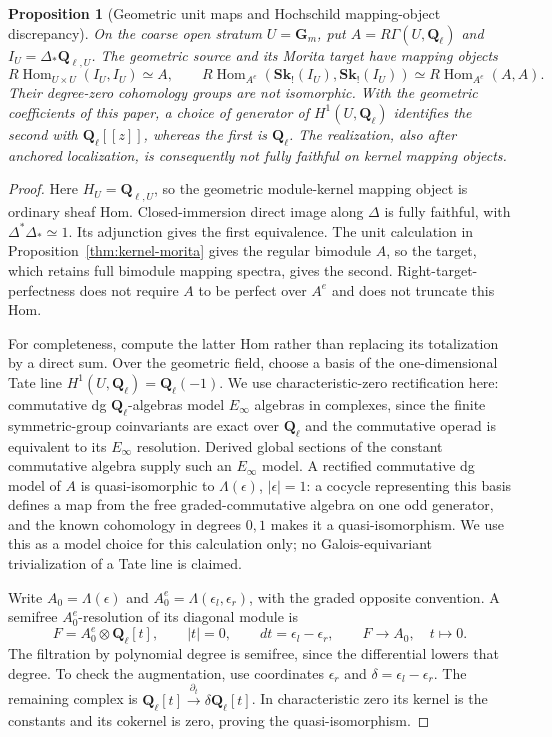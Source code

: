 \documentclass[11pt]{article}
\newtheorem{proposition}{Proposition}[section]
\theoremstyle{definition}
\theoremstyle{remark}
\newcommand{\Q}{\mathbf Q_\ell}
\newcommand{\RHom}{R\operatorname{Hom}}
\newcommand{\Sk}{\mathbf{Sk}}
\begin{document}
\begin{proposition}[Geometric unit maps and Hochschild mapping-object discrepancy]
\label{prop:hochschild-boundary}
On the coarse open stratum $U=\mathbf G_m$, put
$A=R\Gamma(U,\Q)$ and $I_U=\Delta_*\mathbf Q_{\ell,U}$.  The geometric source
and its Morita target have mapping objects
\[
 \RHom_{U\times U}(I_U,I_U)\simeq A,
 \qquad
 \RHom_{A^e}(\Sk_!(I_U),\Sk_!(I_U))
       \simeq\RHom_{A^e}(A,A).
\]
Their degree-zero cohomology groups are not isomorphic.  With the
geometric coefficients of this paper, a choice of generator of
$H^1(U,\Q)$ identifies the second with $\Q[[z]]$, whereas the
first is $\Q$.  The realization, also after anchored localization,
is consequently not fully faithful on kernel mapping objects.
\end{proposition}
\begin{proof}
Here $H_U=\mathbf Q_{\ell,U}$, so the geometric module-kernel mapping object is
ordinary sheaf Hom.  Closed-immersion direct image along $\Delta$
is fully faithful, with $\Delta^*\Delta_*\simeq1$.  Its adjunction
gives the first equivalence.  The unit calculation in
Proposition~\ref{thm:kernel-morita} gives the regular bimodule $A$,
so the target, which retains full bimodule mapping spectra, gives
the second.  Right-target-perfectness does not require $A$ to be
perfect over $A^e$ and does not truncate this Hom.

For completeness, compute the latter Hom rather than replacing its
totalization by a direct sum.  Over the geometric field, choose a
basis of the one-dimensional Tate line $H^1(U,\Q)=\Q(-1)$.
We use characteristic-zero rectification here: commutative dg
$\Q$-algebras model $E_\infty$ algebras in complexes, since the
finite symmetric-group coinvariants are exact over $\Q$ and the
commutative operad is equivalent to its $E_\infty$ resolution.
Derived global sections of the constant commutative algebra supply
such an $E_\infty$ model.  A rectified commutative dg model of $A$
is quasi-isomorphic to
$\Lambda(\epsilon)$, $|\epsilon|=1$: a cocycle representing this
basis defines a map from the free graded-commutative algebra on
one odd generator, and the known cohomology in degrees $0,1$
makes it a quasi-isomorphism.  We use this as a model choice for
this calculation only; no Galois-equivariant trivialization of a
Tate line is claimed.

Write $A_0=\Lambda(\epsilon)$ and
$A_0^e=\Lambda(\epsilon_l,\epsilon_r)$, with the graded opposite
convention.  A semifree $A_0^e$-resolution of its diagonal module is
\[
 F=A_0^e\otimes\Q[t],\qquad |t|=0,\qquad
 dt=\epsilon_l-\epsilon_r,
 \qquad F\longrightarrow A_0,\quad t\longmapsto0.
\]
The filtration by polynomial degree is semifree, since the
differential lowers that degree.  To check the augmentation, use
coordinates $\epsilon_r$ and $\delta=\epsilon_l-\epsilon_r$.
The remaining complex is
$\Q[t]\xrightarrow{\partial_t}\delta\Q[t]$.
In characteristic zero its kernel is the constants and its
cokernel is zero, proving the quasi-isomorphism.


\end{proof}
\end{document}
